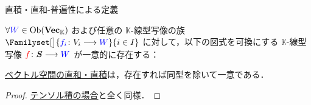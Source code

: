 \documentclass[rep_main]{subfiles}
\begin{document}
\begin{mydef}[label=def:univ-vec-sum,breakable]{直積・直和-普遍性による定義}
\begin{enumerate}
\begin{description}
            $\forall \textcolor{blue}{W} \in \mathrm{Ob}(\bm{\mathrm{Vec}_{\mathbb{K}}})$ および任意の $\mathbb{K}$-線型写像の族 $\Familyset[\big]{\textcolor{blue}{f_i} \colon V_i \lto \textcolor{blue}{W}}{i \in I}$ に対して，以下の図式を可換にする $\mathbb{K}$-線型写像 $\textcolor{red}{f} \colon \bm{S} \longrightarrow \textcolor{blue}{W}$ が一意的に存在する：
            \begin{center}
            \end{center}
        \end{description}
	\end{enumerate}
\end{mydef}

\begin{myprop}[label=prop:unique-vecsum]{}
    \hyperref[def:univ-vec-sum]{ベクトル空間の直和・直積}は，存在すれば同型を除いて一意である．
\end{myprop}

\begin{proof}
    \hyperref[prop:unique-tensor-vec]{テンソル積の場合}と全く同様．
\end{proof}
\end{document}
